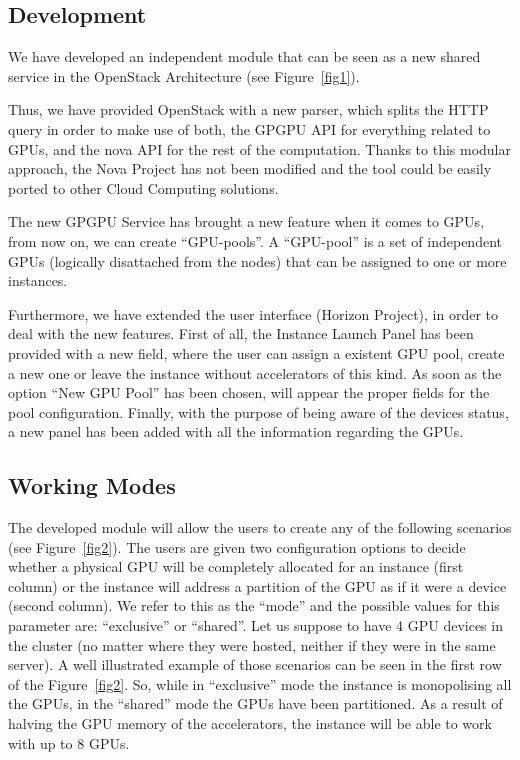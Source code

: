 \documentclass[a4paper,twoside]{article}
\begin{document}
\subsection{Development}
We have developed an independent module that can be seen as a new shared service in the OpenStack Architecture (see Figure~\ref{fig1}).

Thus, we have provided OpenStack with a new parser, which splits the HTTP query in order to make use of both, the GPGPU API for everything related to GPUs, and the nova API for the rest of the computation. 
Thanks to this modular approach, the Nova Project has not been modified and the tool could be easily ported to other Cloud Computing solutions.

The new GPGPU Service has brought a new feature when it comes to GPUs, from now on, we can create ``GPU-pools''. A ``GPU-pool'' is a set of independent GPUs (logically disattached from the nodes) that can be assigned to one or more instances.

Furthermore, we have extended the user interface (Horizon Project), in order to deal with the new features.
First of all, the Instance Launch Panel has been provided with a new field, where the user can assign a existent GPU pool, create a new one or leave the instance without accelerators of this kind.
As soon as the option ``New GPU Pool'' has been chosen, will appear the proper fields for the pool configuration.
Finally, with the purpose of being aware of the devices status, a new panel has been added with all the information regarding the GPUs.

\subsection{Working Modes}
The developed module will allow the users to create any of the following scenarios (see Figure~\ref{fig2}). 
The users are given two configuration options to decide whether a physical GPU will be completely allocated for an instance (first column) or the instance will address a partition of the GPU as if it were a device (second column).
We refer to this as the ``mode'' and the possible values for this parameter are: ``exclusive'' or ``shared''. 
Let us suppose to have 4 GPU devices in the cluster (no matter where they were hosted, neither if they were in the same server). 
A well illustrated example of those scenarios can be seen in the first row of the  Figure~\ref{fig2}.
So, while in ``exclusive'' mode the instance is monopolising all the GPUs, in the ``shared'' mode the GPUs have been partitioned. 
As a result of halving the GPU memory of the accelerators, the instance will be able to work with up to 8 GPUs.
\end{document}
